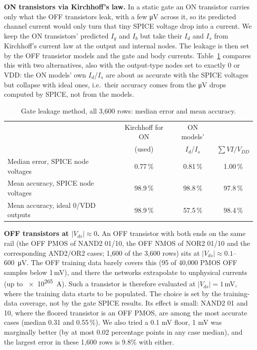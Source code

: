 \documentclass[11pt,a4paper]{article}
\begin{document}
\textbf{ON transistors via Kirchhoff's law.} In a static gate an ON transistor carries only what the
OFF transistors leak, with a few \si{\micro V} across it, so its predicted channel current would only
turn that tiny SPICE voltage drop into a current. We keep the ON transistors' predicted $I_g$ and $I_b$
but take their $I_d$ and $I_s$ from Kirchhoff's current law at the output and internal nodes. The leakage
is then set by the OFF transistor models and the gate and body currents. Table~\ref{tab:gatemethods}
compares this with two alternatives, also with the output-type nodes set to exactly 0 or VDD: the ON
models' own $I_d$/$I_s$ are about as accurate with the SPICE voltages but collapse with ideal ones,
i.e.\ their accuracy comes from the \si{\micro V} drops computed by SPICE, not from the models.

\begin{table}[!htbp]
\centering
\caption{Gate leakage method, all 3{,}600 rows: median error and mean accuracy.}
\label{tab:gatemethods}
\small
\begin{tabular}{lccc}
\toprule
 & Kirchhoff for ON & ON models' & \\
 & (used) & $I_d$/$I_s$ & $\sum V I / V_{DD}$ \\
\midrule
Median error, SPICE node voltages & 0.77\,\% & 0.81\,\% & 1.00\,\% \\
Mean accuracy, SPICE node voltages & 98.9\,\% & 98.8\,\% & 97.8\,\% \\
Mean accuracy, ideal 0/VDD outputs & 98.9\,\% & 57.5\,\% & 98.4\,\% \\
\bottomrule
\end{tabular}
\end{table}

\textbf{OFF transistors at $|V_{ds}| \approx 0$.} An OFF transistor with both ends on the same rail (the
OFF PMOS of NAND2 01/10, the OFF NMOS of NOR2 01/10 and the corresponding AND2/OR2 cases; 1{,}600 of the
3{,}600 rows) sits at $|V_{ds}| \approx 0.1$--\SI{600}{\micro V}. The OFF training data barely covers this
(95 of 40{,}000 PMOS OFF samples below 1\,mV), and there the networks extrapolate to unphysical currents
(up to \SI{e265}{A}). Such a transistor is therefore evaluated at $|V_{ds}| = 1$\,mV, where the training
data starts to be populated. The choice is set by the training-data coverage, not by the gate SPICE
results. Its effect is small: NAND2 01 and 10, where the floored transistor is an OFF PMOS, are among the
most accurate cases (median 0.31 and 0.55\,\%). We also tried a 0.1 mV floor, 1 mV was marginally better (by at most 0.02 percentage points in any case median), and the largest error in these 1,600 rows is 9.8\% with either.
\end{document}
